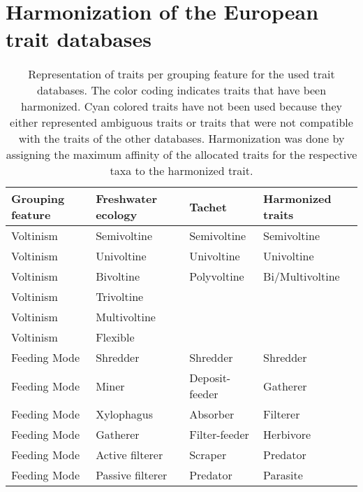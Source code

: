 \documentclass[../Draft_harmonization_paper.tex]{subfiles}
\begin{document}
\newpage

\section*{Harmonization of the European trait databases}
\label{sec:SI_harmonization_EU}

\begin{longtable}{llll}
    \caption{Representation of traits per grouping feature for the used trait databases. The color coding indicates traits that have been harmonized. Cyan colored traits have not been used because they either represented ambiguous traits or traits that were not compatible with the traits of the other databases. Harmonization was done by assigning the maximum affinity of the allocated traits for the respective taxa to the harmonized trait.}
    \endfirsthead
    \endhead
    \hline
    Grouping feature & Freshwater ecology & Tachet & Harmonized traits \\ 
    \hline
    \hline
    Voltinism & Semivoltine & Semivoltine & Semivoltine \\ 
    Voltinism & Univoltine & Univoltine & Univoltine \\ 
    \rowcolor{gray!25}
    Voltinism & Bivoltine & Polyvoltine & Bi/Multivoltine \\ 
    \cellcolor{gray!25}Voltinism & \cellcolor{gray!25}Trivoltine &  &  \\ 
    \cellcolor{gray!25}Voltinism & \cellcolor{gray!25}Multivoltine &  &  \\ 
    \cellcolor{gray!25}Voltinism & \cellcolor{gray!25}Flexible &  &  \\ 
    \rowcolor{blue!25}
    \cellcolor{blue!25}Feeding Mode & \cellcolor{blue!25}Shredder & Shredder & Shredder \\ 
    \cellcolor{blue!25}Feeding Mode & \cellcolor{blue!25}Miner & Deposit-feeder & Gatherer \\ 
    \cellcolor{blue!25}Feeding Mode & \cellcolor{blue!25}Xylophagus & \cellcolor{blue!50}Absorber & \cellcolor{blue!50}Filterer \\ 
    Feeding Mode & Gatherer & \cellcolor{blue!50}Filter-feeder & Herbivore \\ 
    \cellcolor{blue!50}Feeding Mode & \cellcolor{blue!50}Active filterer & Scraper & Predator \\ 
    \cellcolor{blue!50}Feeding Mode & \cellcolor{blue!50}Passive filterer & Predator & Parasite \\ 

\end{longtable}
\end{document}

